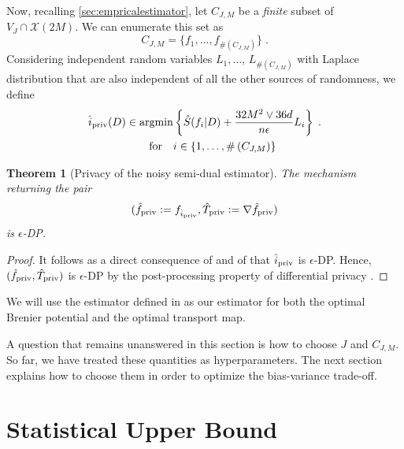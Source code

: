 \documentclass{article}
\theoremstyle{plain}
\newtheorem{theorem}{Theorem}[section]
\theoremstyle{definition}
\theoremstyle{remark}
\newcommand{\argmin}[0]{\operatorname{argmin}}
\newcommand{\eqdef}{\vcentcolon=}
\newcommand\card[1]{\# \left( {#1}\right)}
\begin{document}
Now, recalling \cref{sec:empricalestimator}, let $C_{J, M}$ be a \emph{finite} subset of $V_J \cap \mathcal{X}(2M)$. We can enumerate this set as 
\begin{equation}
    C_{J, M} = \{f_1, \dots, f_{\card{C_{J, M}}} \} \;.
\end{equation}
Considering independent random variables $L_1, \dots$, $ L_{\card{C_{J, M}}}$ with Laplace distribution that are also independent of all the other sources of randomness, we define
\begin{equation}
\begin{aligned}
\hat{i}_{\text{\normalshape priv}}(D) \in \argmin &\left\{\hat{S}(f_i | D) + \frac{32 M^2 \vee 36 d}{n \epsilon} L_i \right\} \;.\\
\textrm{for} \quad & i \in \{1, \dots, \card{C_{J, M}} \}
\end{aligned}
\end{equation}

\begin{theorem}[Privacy of the noisy semi-dual estimator]
    The mechanism returning the pair
    \begin{equation}
\label{eq:private_estimator_definition}
    (\hat{f}_{\text{\normalshape priv}} \eqdef f_{\hat{i}_{\text{\normalshape priv}}}, \hat{T}_{\text{\normalshape priv}} \eqdef \nabla \hat{f}_{\text{\normalshape priv}})
\end{equation}
is $\epsilon$-DP.
\end{theorem}
\begin{proof}
    It follows as a direct consequence of  and of  that $\hat{i}_{\text{\normalshape priv}}$ is $\epsilon$-DP. 
    Hence, $(\hat{f}_{\text{\normalshape priv}}, \hat{T}_{\text{\normalshape priv}})$ is $\epsilon$-DP by the post-processing property of differential privacy \cite{dwork2014algorithmic}.
\end{proof}
We will use the estimator defined in  as our estimator for both the optimal Brenier potential and the optimal transport map. 

A question that remains unanswered in this section is how to choose $J$ and $C_{J, M}$. 
So far, we have treated these quantities as hyperparameters. 
The next section explains how to choose them in order to optimize the bias-variance trade-off.

\section{Statistical Upper Bound}
\label{sec:upperbound}
\end{document}
